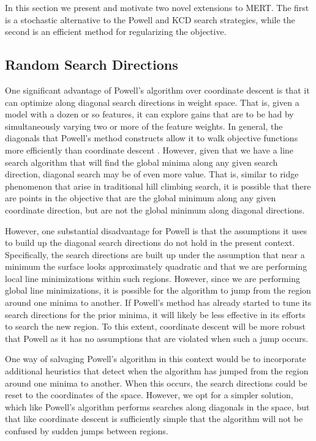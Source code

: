 \documentclass[11pt,tightenlines,kern-1pt]{article}
\begin{document}
In this section we present and motivate two novel extensions to MERT. The first is a stochastic alternative to the Powell and KCD search strategies, while the second is an efficient method for regularizing the objective.

\subsection{Random Search Directions}

One significant advantage of Powell's algorithm over coordinate descent is that it can optimize along diagonal search directions in weight space. That is, given a model with a dozen or so features, it can explore gains that are to be had by simultaneously varying two or more of the feature weights. In general, the diagonals that Powell's method constructs allow it to walk objective functions more efficiently than coordinate descent \cite{press2007}. However, given that we have a line search algorithm that will find the global minima along any given search direction, diagonal search may be of even more value. That is, similar to ridge phenomenon that arise in traditional hill climbing search, it is possible that there are points in the objective that are the global minimum along any given coordinate direction, but are not the global minimum along diagonal directions.  

However, one substantial disadvantage for Powell is that the assumptions it uses to build up the diagonal search directions do not hold in the present context. Specifically, the search directions are built up under the assumption that near a minimum the surface looks approximately quadratic and that we are performing local line minimizations within such regions. However, since we are performing global line minimizations, it is possible for the algorithm to jump from the region around one minima to another. If Powell's method has already started to tune its search directions for the prior minima, it will likely be less effective in its efforts to search the new region. To this extent, coordinate descent will be more robust that Powell as it has no assumptions that are violated when such a jump occurs. 

One way of salvaging Powell's algorithm in this context would be to incorporate additional heuristics that detect when the algorithm has jumped from the region around one minima to another. When this occurs, the search directions could be reset to the coordinates of the space. However, we opt for a simpler solution, which like Powell's algorithm performs searches along diagonals in the space, but that like coordinate descent is sufficiently simple that the algorithm will not be confused by sudden jumps between regions. 
\end{document}
